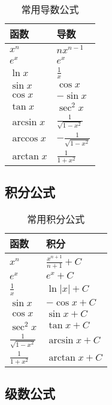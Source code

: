 \begin{table}[htbp]
    \centering
    \caption{常用导数公式}
    \label{tab:derivatives}
    \begin{tabular}{@{}ll@{}}
        \toprule
        函数 & 导数 \\
        \midrule
        $x^n$ & $nx^{n-1}$ \\
        $e^x$ & $e^x$ \\
        $\ln x$ & $\frac{1}{x}$ \\
        $\sin x$ & $\cos x$ \\
        $\cos x$ & $-\sin x$ \\
        $\tan x$ & $\sec^2 x$ \\
        $\arcsin x$ & $\frac{1}{\sqrt{1-x^2}}$ \\
        $\arccos x$ & $-\frac{1}{\sqrt{1-x^2}}$ \\
        $\arctan x$ & $\frac{1}{1+x^2}$ \\
        \bottomrule
    \end{tabular}
\end{table}

\subsection{积分公式}

\begin{table}[htbp]
    \centering
    \caption{常用积分公式}
    \label{tab:integrals}
    \begin{tabular}{@{}ll@{}}
        \toprule
        函数 & 积分 \\
        \midrule
        $x^n$ & $\frac{x^{n+1}}{n+1} + C$ \\
        $e^x$ & $e^x + C$ \\
        $\frac{1}{x}$ & $\ln|x| + C$ \\
        $\sin x$ & $-\cos x + C$ \\
        $\cos x$ & $\sin x + C$ \\
        $\sec^2 x$ & $\tan x + C$ \\
        $\frac{1}{\sqrt{1-x^2}}$ & $\arcsin x + C$ \\
        $\frac{1}{1+x^2}$ & $\arctan x + C$ \\
        \bottomrule
    \end{tabular}
\end{table}

\subsection{级数公式}

